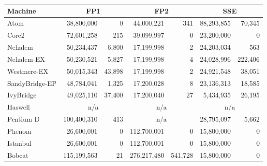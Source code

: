 
\begin{tabular}{|l||r@{$\pm$}r|r@{$\pm$}r|r@{$\pm$}r|}

\hline
Machine   & 
\multicolumn{2}{c|}{FP1} & 
\multicolumn{2}{c|}{FP2} & 
\multicolumn{2}{c|}{SSE} \\
\hline
\hline

Atom         &  38,800,000 &   0 & 44,000,221 & 341 & 88,293,855 & 70,345 \\
\hline
Core2        &  72,601,258 & 215 &  39,099,997 & 0 & 23,200,000 & 0   \\
\hline
Nehalem      &  50,234,437 & 6,800 &  17,199,998 & 2 & 24,203,034 & 563 \\
\hline
Nehalem-EX   &  50,230,521 & 5,827 &  17,199,998 & 4 & 24,028,996 & 222,406 \\
\hline
Westmere-EX  &  50,015,343 & 43,898 & 17,199,998 & 2  & 24,921,548 & 38,051 \\
\hline
SandyBridge-EP &  48,784,041 & 1,325 &  17,200,028 & 8 & 23,136,313 & 18,585 \\
\hline
IvyBridge    &  49,025,110 & 37,400 & 17,200,040 & 27 &  5,434,935 & 26,195  \\
\hline
Haswell		& \multicolumn{2}{c|}{n/a} & \multicolumn{2}{c|}{n/a} & \multicolumn{2}{c|}{n/a} \\
\hline
Pentium D    & 100,400,310 & 413 & \multicolumn{2}{c|}{n/a} & 28,795,097 & 5,662\\
\hline
Phenom       & 26,600,001 & 0  & 112,700,001 & 0 &  15,800,000 & 0\\
\hline
Istanbul     & 26,600,001 & 0  & 112,700,001 & 0 & 15,800,000 & 0 \\
\hline
Bobcat       & 115,199,563 & 21  & 276,217,480 & 541,728 & 15,800,000 & 0 \\
\hline
\end{tabular}
%

